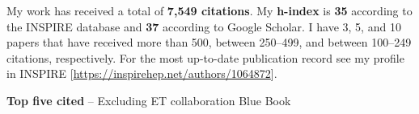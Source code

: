 \documentclass[11pt]{article}
\makeatletter
\newlength{\bibsep}
 {\@listi \global\bibsep\itemsep \global\advance\bibsep by\parsep}
\newcommand{\blankline}{\quad\pagebreak[3]}
\newcommand{\halfblankline}{\quad\vspace{-0.5\baselineskip}\pagebreak[3]}
\makeatother
\begin{document}
    \halfblankline

    My work has received a total of \textbf{7,549 citations}.
    My \textbf{h-index} is \textbf{35} according to the INSPIRE database and
    \textbf{37} according to Google Scholar.
    I have 3, 5, and 10 papers that have received more than 500, between 250--499,
    and between 100--249 citations, respectively.
    For the most up-to-date publication record see my profile in INSPIRE
    [\href{https://inspirehep.net/authors/1064872}{https://inspirehep.net/authors/1064872}].

	\blankline

    \textbf{Top five cited} -- Excluding ET collaboration Blue Book
\end{document}
